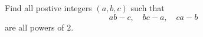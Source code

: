 Find all postive integers 
$(a,b,c)$
 such that
$$ab-c,\quad bc-a,\quad ca-b$$
are all powers of 
$2$.
